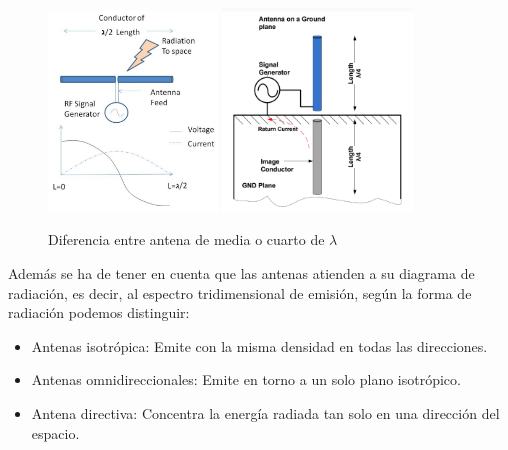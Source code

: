 \documentclass[a4paper ,12pt, onecolumn]{article}
\begin{document}
            \begin{center}
                \begin{figure}[h]
                    \centering
                    \includegraphics[width=0.4\textwidth]{antenna_design.png}
                    \includegraphics[width=0.45\textwidth]{antenna_design_monopole.png}
                    \caption{Diferencia entre antena de media o cuarto de $\lambda$}
                    \label{fig:mesh8}
                \end{figure}
            \end{center}
            Además se ha de tener en cuenta que las antenas atienden a su diagrama de radiación, es decir, al
            espectro tridimensional de emisión, según la forma de radiación podemos distinguir:
            \begin{itemize}
                \item  Antenas isotrópica: Emite con la misma densidad en todas las direcciones.
                \item  Antenas omnidireccionales: Emite en torno a un solo plano isotrópico.
                \item  Antena directiva: Concentra la energía radiada tan solo en una dirección del espacio.
            \end{itemize}
\end{document}
